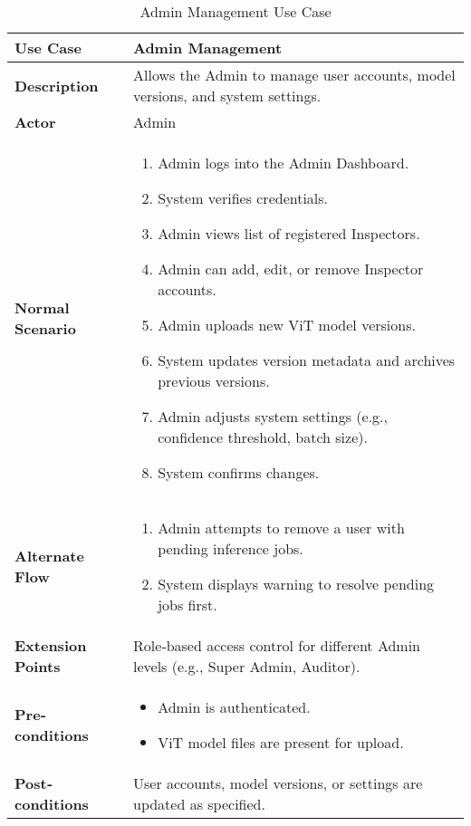\newpage

\begin{table}[h!]
    \centering
    \fontsize{10}{12}\selectfont
    \caption{Admin Management Use Case}
    \label{tab:admin_manage}
    \begin{tabular}{|l|p{10cm}|}
        \hline
        \textbf{Use Case}         & Admin Management                                                    \\ \hline
        \textbf{Description}      & Allows the Admin to manage user accounts, model versions, and system settings. \\ \hline
        \textbf{Actor}            & Admin                                                               \\ \hline
        \textbf{Normal Scenario}  &
        \begin{enumerate}
            \item Admin logs into the Admin Dashboard.
            \item System verifies credentials.
            \item Admin views list of registered Inspectors.
            \item Admin can add, edit, or remove Inspector accounts.
            \item Admin uploads new ViT model versions.
            \item System updates version metadata and archives previous versions.
            \item Admin adjusts system settings (e.g., confidence threshold, batch size).
            \item System confirms changes.
        \end{enumerate}                                                      \\ \hline
        \textbf{Alternate Flow}   &
        \begin{enumerate}
            \item Admin attempts to remove a user with pending inference jobs.
            \item System displays warning to resolve pending jobs first.
        \end{enumerate}                                                      \\ \hline
        \textbf{Extension Points} & Role‐based access control for different Admin levels (e.g., Super Admin, Auditor). \\ \hline
        \textbf{Pre‐conditions}   &
        \begin{itemize}
            \item Admin is authenticated.
            \item ViT model files are present for upload.
        \end{itemize}                                                         \\ \hline
        \textbf{Post‐conditions}  & User accounts, model versions, or settings are updated as specified.    \\ \hline
    \end{tabular}
\end{table}

